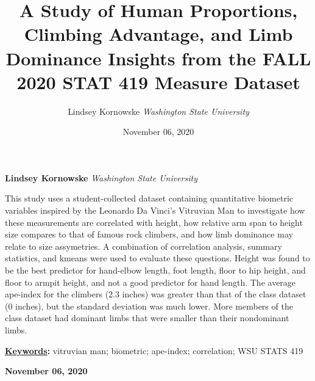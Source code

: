 \documentclass[]{article}
\title{\textbf{\textcolor{WSU.crimson}{A Study of Human Proportions,
Climbing Advantage, and Limb
Dominance}} \newline \textbf{\textcolor{WSU.gray}{Insights from the FALL
2020 STAT 419 Measure Dataset}}  }
\author{\Large Lindsey
Kornowske\vspace{0.05in} \newline\normalsize\emph{Washington State
University}  }
\date{November 06, 2020}
\newcommand*{\authorfont}{\fontfamily{phv}\selectfont}
\renewenvironment{abstract}
 {{%
    \setlength{\leftmargin}{0mm}
    \setlength{\rightmargin}{\leftmargin}%
  }%
  \relax}
 {\endlist}
\begin{document}
	
%    


{%
\setlength{\parindent}{0pt}
\thispagestyle{plain}
{\fontsize{18}{20}\selectfont\raggedright 
\maketitle  %

}

{
   \vskip 13.5pt\relax \normalsize\fontsize{11}{12} 
   
\textbf{\authorfont Lindsey
Kornowske} \hskip 15pt \emph{\small Washington State University}   

}

}








\begin{abstract}

    \hbox{\vrule height .2pt width 39.14pc}

    \vskip 8.5pt %

\noindent This study uses a student-collected dataset containing
quantitative biometric variables inspired by the Leonardo Da Vinci's
Vitruvian Man to investigate how these measurements are correlated with
height, how relative arm span to height size compares to that of famous
rock climbers, and how limb dominance may relate to size assymetries. A
combination of correlation analysis, summary statistics, and kmeans were
used to evaluate these questions. Height was found to be the best
predictor for hand-elbow length, foot length, floor to hip height, and
floor to armpit height, and not a good predictor for hand length. The
average ape-index for the climbers (2.3 inches) was greater than that of
the class dataset (0 inches), but the standard deviation was much lower.
More members of the class dataset had dominant limbs that were smaller
than their nondominant limbs. \vspace{0.25in}


\vskip 8.5pt \noindent \textbf{\underline{Keywords}:} vitruvian man;
biometric; ape-index; correlation; WSU STATS 419 \par

    




    
    \hbox{\vrule height .2pt width 39.14pc}
    \vskip 5pt 
    \hfill \textbf{\textcolor{WSU.gray}{ November 06, 2020 } }
    \vskip 5pt 
    
\end{abstract}
\end{document}
